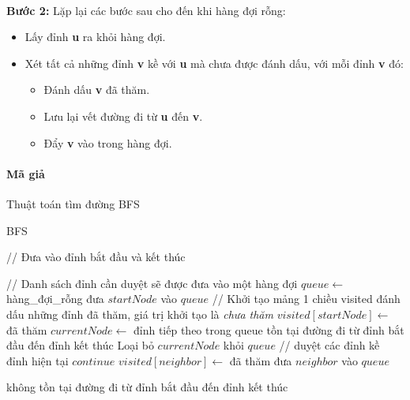 \paragraph{}{\textbf{Bước 2:} Lặp lại các bước sau cho đến khi hàng đợi rỗng:}
\begin{itemize}
    \item Lấy đỉnh \textbf{u} ra khỏi hàng đợi.
    \item Xét tất cả những đỉnh \textbf{v} kề với \textbf{u} mà chưa được đánh dấu, với mỗi đỉnh \textbf{v} đó:
    \begin{itemize}
        \item Đánh dấu \textbf{v} đã thăm.
        \item Lưu lại vết đường đi từ \textbf{u} đến \textbf{v}.
        \item Đẩy \textbf{v} vào trong hàng đợi.
    \end{itemize}
\end{itemize}

\paragraph{Mã giả}{Thuật toán tìm đường BFS}

\begin{algorithm}[H]
\caption{BFS}
\label{alg:bfs}
\begin{algorithmic}
 // Đưa vào đỉnh bắt đầu và kết thúc

\State // Danh sách đỉnh cần duyệt sẽ được đưa vào một hàng đợi
\State $queue  \gets$ hàng\_đợi\_rỗng
\State đưa $startNode$ vào $queue$
\State
\State // Khởi tạo mảng 1 chiều visited đánh dấu những đỉnh đã thăm, giá trị khởi tạo là \textit{chưa thăm }
\State $visited[startNode] \gets$ đã thăm 
\State
{}
\State $currentNode \gets$ đỉnh tiếp theo trong queue
\State \Return tồn tại đường đi từ đỉnh bắt đầu đến đỉnh kết thúc
\EndIf
\State Loại bỏ $currentNode$ khỏi $queue$
 // duyệt các đỉnh kề đỉnh hiện tại
\State $continue$
\EndIf
\State $visited[neighbor] \gets$ đã thăm
\State đưa $neighbor$ vào $queue$
\EndFor

\Return không tồn tại đường đi từ đỉnh bắt đầu đến đỉnh kết thúc
\EndWhile
\EndFunction
\end{algorithmic}
\end{algorithm}

